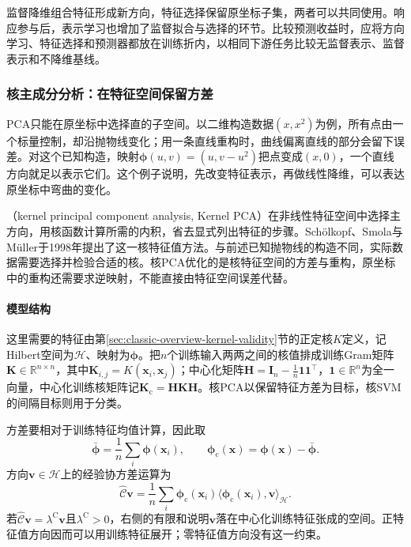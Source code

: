 监督降维组合特征形成新方向，特征选择保留原坐标子集，两者可以共同使用。响应参与后，表示学习也增加了监督拟合与选择的环节。比较预测收益时，应将方向学习、特征选择和预测器都放在训练折内，以相同下游任务比较无监督表示、监督表示和不降维基线。

\subsubsection{核主成分分析：在特征空间保留方差}
\label{sec:dim-kpca}

PCA只能在原坐标中选择直的子空间。以二维构造数据$(x,x^2)$为例，所有点由一个标量控制，却沿抛物线变化；用一条直线重构时，曲线偏离直线的部分会留下误差。对这个已知构造，映射$\bm\phi(u,v)=(u,v-u^2)$把点变成$(x,0)$，一个直线方向就足以表示它们。这个例子说明，先改变特征表示，再做线性降维，可以表达原坐标中弯曲的变化。

（kernel principal component analysis, Kernel PCA）在非线性特征空间中选择主方向，用核函数计算所需的内积，省去显式列出特征的步骤。Schölkopf、Smola与Müller于1998年提出了这一核特征值方法。与前述已知抛物线的构造不同，实际数据需要选择并检验合适的核。核PCA优化的是核特征空间的方差与重构，原坐标中的重构还需要求逆映射，不能直接由特征空间误差代替。

\paragraph{模型结构}

这里需要的特征由第\ref{sec:classic-overview-kernel-validity}节的正定核$K$定义，记Hilbert空间为$\mathcal{H}$、映射为$\bm{\phi}$。把$n$个训练输入两两之间的核值排成训练Gram矩阵$\bm K\in\mathbb R^{n\times n}$，其中$\bm K_{i,j}=K(\bm x_i,\bm x_j)$；中心化矩阵$\bm H=\bm I_n-\frac1n\mathbf1\mathbf1^{\top}$，$\mathbf1\in\mathbb R^n$为全一向量，中心化训练核矩阵记$\bm K_{\mathrm c}=\bm H\bm K\bm H$。核PCA以保留特征方差为目标，核SVM的间隔目标则用于分类。

方差要相对于训练特征均值计算，因此取
\[
  \bar{\bm{\phi}}=\frac1n\sum_i\bm{\phi}(\bm{x}_i),
  \qquad
  \bm{\phi}_{\mathrm{c}}(\bm{x})=\bm{\phi}(\bm{x})-\bar{\bm{\phi}}.
\]
方向$\bm{v}\in\mathcal{H}$上的经验协方差运算为
\begin{equation}
  \label{eq:dim-kpca-covariance}
  \widehat{\mathcal{C}}\bm{v}
  =\frac1n\sum_i
    \bm{\phi}_{\mathrm{c}}(\bm{x}_i)
    \langle\bm{\phi}_{\mathrm{c}}(\bm{x}_i),\bm{v}\rangle_{\mathcal{H}}.
\end{equation}
若$\widehat{\mathcal{C}}\bm{v}=\lambda^{\mathrm{C}}\bm{v}$且$\lambda^{\mathrm{C}}>0$，右侧的有限和说明$\bm{v}$落在中心化训练特征张成的空间。正特征值方向因而可以用训练特征展开；零特征值方向没有这一约束。

